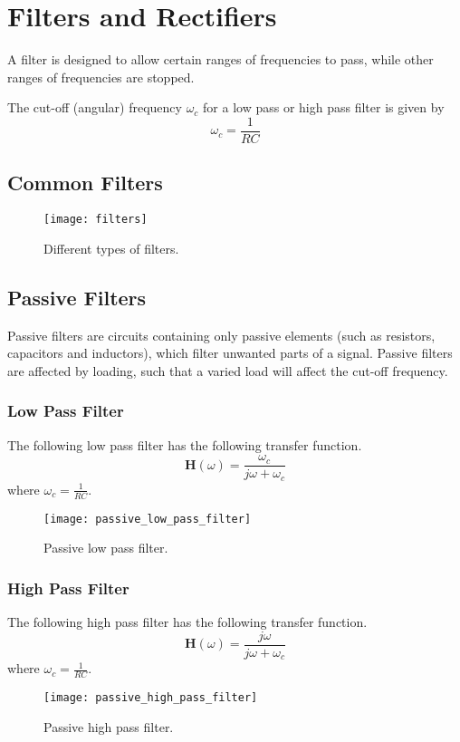 \documentclass{article}
\begin{document}
\section{Filters and Rectifiers}
\begin{definition}[Filters]
    A filter is designed to allow certain ranges of frequencies to pass,
    while other ranges of frequencies are stopped.
\end{definition}
\begin{definition}
    The cut-off (angular) frequency $\omega_c$ for a low pass or high pass filter is given by
    \begin{equation*}
        \omega_c = \frac{1}{RC}
    \end{equation*}
\end{definition}
\subsection{Common Filters}
\begin{figure}[H]
    \centering
    \texttt{[image: filters]}
    \caption{Different types of filters.}
\end{figure}
\subsection{Passive Filters}
Passive filters are circuits containing only passive elements
(such as resistors, capacitors and inductors),
which filter unwanted parts of a signal.
Passive filters are affected by loading, such that a varied load will
affect the cut-off frequency.
\subsubsection{Low Pass Filter}
The following low pass filter has the following transfer function.
\begin{equation*}
    \symbf{H}(\omega) = \frac{\omega_c}{j\omega + \omega_c}
\end{equation*}
where $\omega_c = \frac{1}{RC}$.
\begin{figure}[H]
    \centering
    \texttt{[image: passive\_low\_pass\_filter]}
    \caption{Passive low pass filter.}
\end{figure}
\subsubsection{High Pass Filter}
The following high pass filter has the following transfer function.
\begin{equation*}
    \symbf{H}(\omega) = \frac{j\omega}{j\omega + \omega_c}
\end{equation*}
where $\omega_c = \frac{1}{RC}$.
\begin{figure}[H]
    \centering
    \texttt{[image: passive\_high\_pass\_filter]}
    \caption{Passive high pass filter.}
\end{figure}
\end{document}
